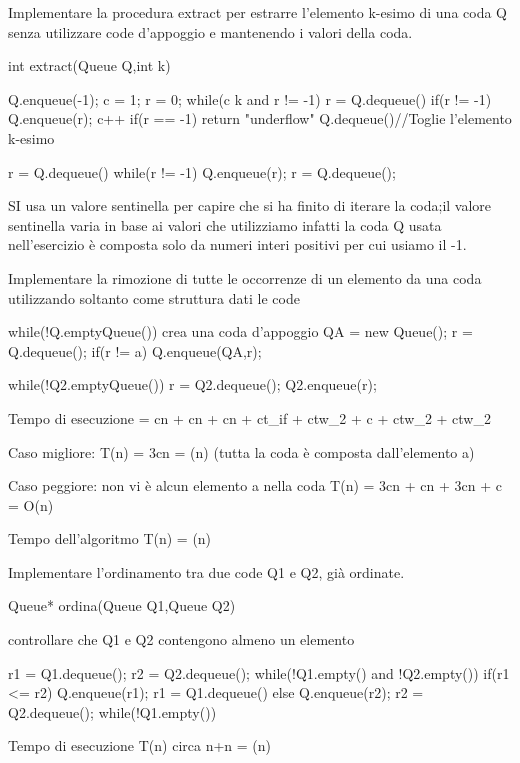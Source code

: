 Implementare la procedura extract per estrarre l'elemento k-esimo  di una coda Q
senza utilizzare code d'appoggio e mantenendo i valori della coda.

int extract(Queue Q,int k){
    Q.enqueue(-1);
    c = 1;
    r = 0;
    while(c \leq k and r != -1){
        r = Q.dequeue()
        if(r != -1){
          Q.enqueue(r);
        }
        c++
    }
    if(r == -1)
        return "underflow"
    Q.dequeue()//Toglie l'elemento k-esimo

    r = Q.dequeue()
    while(r != -1){
        Q.enqueue(r);
        r = Q.dequeue();
    }
}

SI usa un valore sentinella per capire che si ha finito di iterare la coda;il valore sentinella
varia in base ai valori che utilizziamo infatti la coda Q usata nell'esercizio è
composta solo da numeri interi positivi per cui usiamo il -1.


Implementare la rimozione di tutte le occorrenze di un elemento da una coda utilizzando
soltanto come struttura dati le code



while(!Q.emptyQueue()){
    crea una coda d'appoggio QA = new Queue();
    r = Q.dequeue();
    if(r != a){
      Q.enqueue(QA,r);
    }
}

while(!Q2.emptyQueue()){
    r = Q2.dequeue();
    Q2.enqueue(r);
}

Tempo di esecuzione = cn + cn + cn + ct_if + ctw_2 + c + ctw_2 + ctw_2

Caso migliore: T(n) = 3cn = \Omega(n) (tutta la coda è composta dall'elemento a)

Caso peggiore: non vi è alcun elemento a nella coda
   T(n) = 3cn + cn + 3cn + c = O(n)

Tempo dell'algoritmo T(n) = \Theta(n)


Implementare l'ordinamento tra due code Q1 e Q2, già ordinate.

Queue* ordina(Queue Q1,Queue Q2){
    controllare che Q1 e Q2 contengono almeno un elemento

    r1 = Q1.dequeue();
    r2 = Q2.dequeue();
    while(!Q1.empty() and !Q2.empty()){
          if(r1 <= r2){
              Q.enqueue(r1);
              r1 = Q1.dequeue()
          }else{
              Q.enqueue(r2);
              r2 = Q2.dequeue();
          }
    }
    while(!Q1.empty()){

    }
}

Tempo di esecuzione T(n) circa n+n = \Theta(n)%
